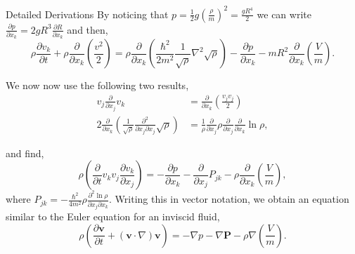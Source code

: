 \begin{chapter}{Detailed Derivations\label{app:App2}}
By noticing that $p = \frac{1}{2}g \left ( \frac{\rho}{m} \right ) ^2 = \frac{gR^4}{2}$ we can write $\frac{\partial p}{\partial x_k} = 2gR^3\frac{\partial R}{\partial x_k}$ and then,
\begin{equation*}
\rho\frac{\partial v_k}{\partial t} + \rho\frac{\partial}{\partial x_k} \left (\frac{v^2}{2}\right) =\rho \frac{\partial}{\partial x_k}\left(\frac{\hbar^2}{2m^2} \frac{1}{\sqrt{\rho}} \nabla^2\sqrt{\rho} \right) - \frac{\partial p}{\partial x_k} - mR^2\frac{\partial}{\partial x_k}\left ( \frac{V}{m}\right ).
\end{equation*}

We now now use the following two results,
\begin{align*}
v_j \frac{\partial}{\partial x_j}v_k &= \frac{\partial}{\partial x_k}\left ( \frac{v_jv_j}{2}\right )\\
2\frac{\partial}{\partial x_k}\left( \frac{1}{\sqrt{\rho}} \frac{\partial^2}{\partial x_j \partial x_j} \sqrt{\rho}\right) &= \frac{1}{\rho} \frac{\partial}{\partial x_j}\rho \frac{\partial}{\partial x_j}\frac{\partial}{\partial x_k} \ln{\rho},
\end{align*}

and find,
\begin{equation*}
\rho\left ( \frac{\partial}{\partial t} v_k v_j\frac{\partial v_k}{\partial x_j}\right) = -\frac{\partial p}{\partial x_k} - \frac{\partial}{\partial x_j} P_{jk} - \rho \frac{\partial}{\partial x_k}\left( \frac{V}{m} \right),
\end{equation*}
where $P_{jk} = -\frac{\hbar^2}{4m^2}\rho\frac{\partial^2\ln{\rho}}{\partial x_j \partial x_k}$. Writing this in vector notation, we obtain an equation similar to the Euler equation for an inviscid fluid,
\begin{equation}
\rho\left( \frac{\partial \mathbf{v}}{\partial t} + \left( \mathbf{v} \cdot \nabla \right)\mathbf{v} \right) = -\nabla p - \nabla \mathbf{P} - \rho \nabla \left(\frac{V}{m}\right).
\end{equation}


\end{chapter}
